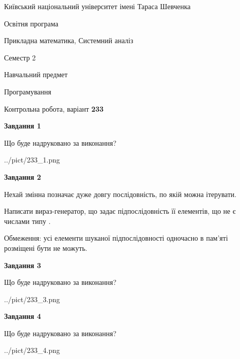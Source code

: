 \documentclass[12pt, ukrainian]{article}
\begin{document}
{{\begin {small}\par
{ \center  Київський національний університет імені Тараса Шевченка \par}
{\parbox {5 cm}{Освітня програма \hfill}{\parbox {8 cm}{Прикладна математика, Системний аналіз \hfill}}\parbox {5 cm}{\hfill Семестр 2}}\par
{\parbox {5 cm} {Навчальний предмет \hfill}\parbox {7 cm}{Програмування \hfill}\parbox {6cm}{\hfill}\par}\vspace{-7pt} \end{small}}{\center Контрольна робота, варіант  \No \textbf
{ 233 }\par}}
{
\begin {large}
{\begin {center}\textbf{Завдання 1}\end {center}}\par
Що буде надруковано за виконання?\par\par
\begin{center}
	{../pict/233_1.png}
\end{center}
\newpage

{\begin {center}\textbf{Завдання 2}\end {center}}\par
Нехай змінна  позначає дуже довгу послідовність, по якій можна ітерувати.

Написати вираз-генератор, що задає підпослідовність її елементів, що не є числами типу .

Обмеження: усі елементи шуканої підпослідовності одночасно в пам'яті розміщені бути не можуть.\par
\newpage

{\begin {center}\textbf{Завдання 3}\end {center}}\par
Що буде надруковано за виконання?\par
\begin{center}
	{../pict/233_3.png}
\end{center}
\newpage

{\begin {center}\textbf{Завдання 4}\end {center}}\par
Що буде надруковано за виконання?\par
\begin{center}
	{../pict/233_4.png}
\end{center}
\newpage


\end{large}}
\end{document}
